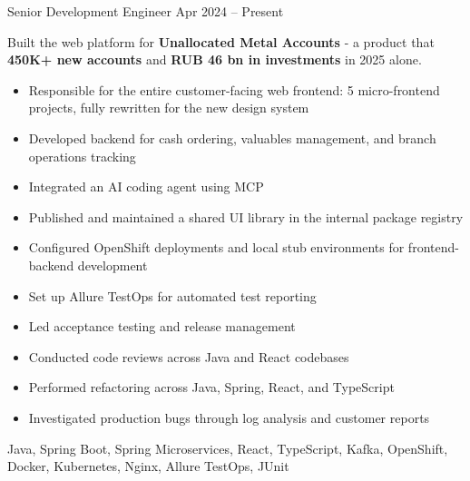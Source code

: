 \renewcommand{\labelitemi}{$\bullet$}
\begin{works}
    \work
        {Senior Development Engineer} {} {} {Apr 2024 -- Present}
        {
            Built the web platform for \textbf{Unallocated Metal Accounts} - a product that  \textbf{450K+ new accounts} and \textbf{RUB 46 bn in investments} in 2025 alone.

            \begin{itemize}
                \item {Responsible for the entire customer-facing web frontend: 5 micro-frontend projects, fully rewritten for the new design system}
                \item {Developed backend for cash ordering, valuables management, and branch operations tracking}
                \item {Integrated an AI coding agent using MCP}
                \item {Published and maintained a shared UI library in the internal package registry}
                \item {Configured OpenShift deployments and local stub environments for frontend-backend development}
                \item {Set up Allure TestOps for automated test reporting}
                \item {Led acceptance testing and release management}
                \item {Conducted code reviews across Java and React codebases}
                \item {Performed refactoring across Java, Spring, React, and TypeScript}
                \item {Investigated production bugs through log analysis and customer reports}
            \end{itemize}
        }
        {
            Java, Spring Boot, Spring Microservices, React, TypeScript, Kafka, OpenShift, Docker, Kubernetes, Nginx, Allure TestOps, JUnit
        }


\end{works}
